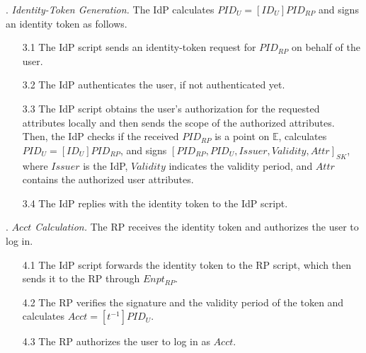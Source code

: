 . {\em Identity-Token Generation.}
The IdP calculates $PID_U = [ID_U]{PID_{RP}}$ and signs an identity token  as follows. %
\vspace{-\topsep}
\begin{itemize}
\setlength{\topsep}{0pt}
\setlength{\partopsep}{0pt}
\setlength{\itemsep}{0pt}
\setlength{\parsep}{0pt}
\setlength{\parskip}{0pt}
\item[3.1]
The IdP script sends an identity-token request for $PID_{RP}$ on behalf of the user. %

\item[3.2] The IdP authenticates the user, if not authenticated yet.

\item [3.3]
The IdP script obtains the user's authorization for the requested attributes locally and then sends the scope of the authorized attributes.
Then, the IdP checks if the received $PID_{RP}$ is a point on $\mathbb{E}$,
calculates $PID_U = [ID_U]{PID_{RP}}$, and signs $[PID_{RP}, PID_U, Issuer, Validity, Attr]_{SK}$, where $Issuer$ is the IdP, $Validity$ indicates the validity period, and $Attr$ contains the authorized user attributes.
\item[3.4] The IdP replies with the identity token to the IdP script.
\end{itemize}

. {\em $Acct$ Calculation.}
The RP receives the identity token and authorizes the user to log in.
\vspace{-\topsep}
\begin{itemize}
\setlength{\topsep}{0pt}
\setlength{\partopsep}{0pt}
\setlength{\itemsep}{0pt}
\setlength{\parsep}{0pt}
\setlength{\parskip}{0pt}
\item [4.1]
The IdP script forwards the identity token to the RP script,
    which then sends it to the RP through $Enpt_{RP}$.
\item[4.2] The RP verifies the signature and the validity period of the token 
and calculates $Acct = [t^{-1}]{PID_U}$.

\item [4.3] The RP authorizes the user to log in as $Acct$.

\end{itemize}


